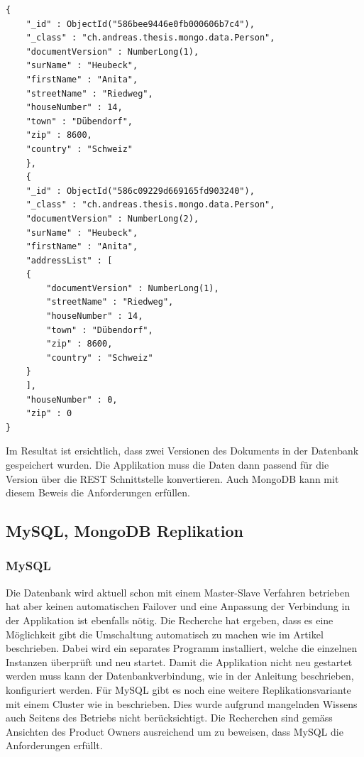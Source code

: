 \begin{lstlisting}
{
	"_id" : ObjectId("586bee9446e0fb000606b7c4"),
	"_class" : "ch.andreas.thesis.mongo.data.Person",
	"documentVersion" : NumberLong(1),
	"surName" : "Heubeck",
	"firstName" : "Anita",
	"streetName" : "Riedweg",
	"houseNumber" : 14,
	"town" : "Dübendorf",
	"zip" : 8600,
	"country" : "Schweiz"
	},
	{
	"_id" : ObjectId("586c09229d669165fd903240"),
	"_class" : "ch.andreas.thesis.mongo.data.Person",
	"documentVersion" : NumberLong(2),
	"surName" : "Heubeck",
	"firstName" : "Anita",
	"addressList" : [
	{
		"documentVersion" : NumberLong(1),
		"streetName" : "Riedweg",
		"houseNumber" : 14,
		"town" : "Dübendorf",
		"zip" : 8600,
		"country" : "Schweiz"
	}	
	],
	"houseNumber" : 0,
	"zip" : 0
}
\end{lstlisting}
Im Resultat ist ersichtlich, dass zwei Versionen des Dokuments in der Datenbank gespeichert wurden. Die Applikation muss die Daten dann passend für die Version über die REST Schnittstelle konvertieren. Auch MongoDB kann mit diesem Beweis die Anforderungen erfüllen.

\subsection{MySQL, MongoDB Replikation}

\subsubsection{MySQL}

Die Datenbank wird aktuell schon mit einem Master-Slave Verfahren betrieben hat aber keinen automatischen Failover und eine Anpassung der Verbindung in der Applikation ist ebenfalls nötig. Die Recherche hat ergeben, dass es eine Möglichkeit gibt die Umschaltung automatisch zu machen wie im Artikel \cite{mysqlrep} beschrieben. Dabei wird ein separates Programm installiert, welche die einzelnen Instanzen überprüft und neu startet. Damit die Applikation nicht neu gestartet werden muss kann der Datenbankverbindung, wie in der Anleitung \cite{mysqljdbc} beschrieben, konfiguriert werden. Für MySQL gibt es noch eine weitere Replikationsvariante mit einem Cluster wie in \cite{mysqlcluster} beschrieben. Dies wurde aufgrund mangelnden Wissens auch Seitens des Betriebs nicht berücksichtigt. Die Recherchen sind gemäss Ansichten des Product Owners ausreichend um zu beweisen, dass MySQL die Anforderungen erfüllt.

